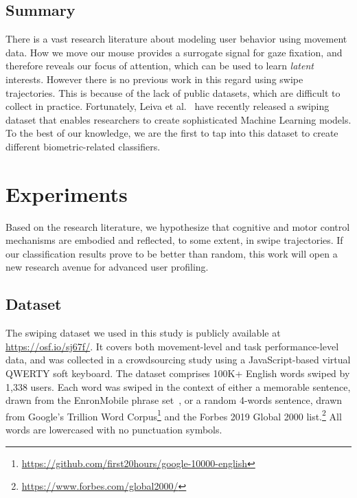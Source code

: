 \documentclass[sn-mathphys, pdflatex]{sn-jnl}
\newcommand{\rev}[1]{#1}
\begin{document}
\subsection{Summary}

There is a vast research literature about modeling user behavior using movement data.
How we move our mouse provides a surrogate signal for gaze fixation,
and therefore reveals our focus of attention,
which can be used to learn \emph{latent} interests.
However there is no previous work in this regard using swipe trajectories.
This is because of the lack of public datasets, which are difficult to collect in practice.
Fortunately, Leiva et al.~\cite{Leiva21_swipe} have recently released a swiping dataset
that enables researchers to create sophisticated Machine Learning models.
To the best of our knowledge, we are the first to tap into this dataset
to create different biometric-related classifiers.


\section{Experiments}
\label{sec:experiments}

Based on the research literature,
we hypothesize that cognitive and motor control mechanisms are embodied
and reflected, to some extent, in swipe trajectories.
If our classification results prove to be better than random,
this work will open a new research avenue for advanced user profiling.

\subsection{Dataset}


The swiping dataset we used in this study is publicly available at \url{https://osf.io/sj67f/}.
It covers both movement-level and task performance-level data,
and was collected in a crowdsourcing study using a JavaScript-based virtual QWERTY \rev{soft} keyboard.
The dataset comprises 100K+ English words swiped by 1,338 users.
Each word was swiped in the context of either a memorable sentence,
drawn from the EnronMobile phrase set~\cite{Vertanen11_enron},
or a random 4-words sentence, drawn from Google's Trillion Word Corpus\footnote{\url{https://github.com/first20hours/google-10000-english}}
and the Forbes 2019 Global 2000 list.\footnote{\url{https://www.forbes.com/global2000/}}
All words are lowercased with no punctuation symbols.
\end{document}
